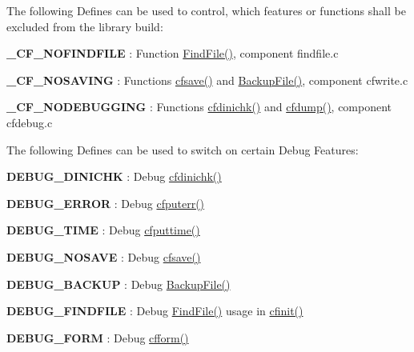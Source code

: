 The following Defines can be used to control, which features or functions shall be excluded from the library build\-:


\begin{DoxyItemize}
\item {\bfseries \-\_\-\-C\-F\-\_\-\-N\-O\-F\-I\-N\-D\-F\-I\-L\-E} \-: Function \hyperlink{group__utilities_ga59fc2b29cf26051e0854b664f5aed15d}{Find\-File()}, component findfile.\-c
\begin{DoxyItemize}
\item {\bfseries \-\_\-\-C\-F\-\_\-\-N\-O\-S\-A\-V\-I\-N\-G} \-: Functions \hyperlink{group__setting__saving_gaad7e1267cd904b4480a0eeaeb03b5f75}{cfsave()} and \hyperlink{group__utilities_ga0fccda7427db33b2f73a3b6dca864207}{Backup\-File()}, component cfwrite.\-c
\item {\bfseries \-\_\-\-C\-F\-\_\-\-N\-O\-D\-E\-B\-U\-G\-G\-I\-N\-G} \-: Functions \hyperlink{group__advanced__features_ga35e2c28f591ac71e3617c612233ecdd0}{cfdinichk()} and \hyperlink{group__advanced__features_gaecfc8ee37366e1b36cb5aac0cc41ebdc}{cfdump()}, component cfdebug.\-c
\end{DoxyItemize}
\end{DoxyItemize}

The following Defines can be used to switch on certain Debug Features\-:


\begin{DoxyItemize}
\item {\bfseries D\-E\-B\-U\-G\-\_\-\-D\-I\-N\-I\-C\-H\-K} \-: Debug \hyperlink{group__advanced__features_ga35e2c28f591ac71e3617c612233ecdd0}{cfdinichk()}
\begin{DoxyItemize}
\item {\bfseries D\-E\-B\-U\-G\-\_\-\-E\-R\-R\-O\-R} \-: Debug \hyperlink{group__errors_gaad2687826308f21b54657d2728e4cfcc}{cfputerr()}
\item {\bfseries D\-E\-B\-U\-G\-\_\-\-T\-I\-M\-E} \-: Debug \hyperlink{group__setting__saving_ga6f133f88dc253a6a80d13eed4d123063}{cfputtime()}
\item {\bfseries D\-E\-B\-U\-G\-\_\-\-N\-O\-S\-A\-V\-E} \-: Debug \hyperlink{group__setting__saving_gaad7e1267cd904b4480a0eeaeb03b5f75}{cfsave()}
\item {\bfseries D\-E\-B\-U\-G\-\_\-\-B\-A\-C\-K\-U\-P} \-: Debug \hyperlink{group__utilities_ga0fccda7427db33b2f73a3b6dca864207}{Backup\-File()}
\item {\bfseries D\-E\-B\-U\-G\-\_\-\-F\-I\-N\-D\-F\-I\-L\-E} \-: Debug \hyperlink{group__utilities_ga59fc2b29cf26051e0854b664f5aed15d}{Find\-File()} usage in \hyperlink{group__cflib__core_ga64fb341565c2ddfccd6669e5e6265a8a}{cfinit()}
\item {\bfseries D\-E\-B\-U\-G\-\_\-\-F\-O\-R\-M} \-: Debug \hyperlink{group__report__generation_ga2695585ee0a7485da6075848fa27a33f}{cfform()}
\end{DoxyItemize}
\end{DoxyItemize}

